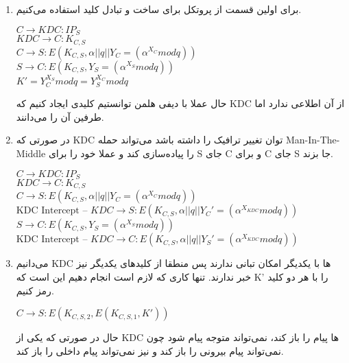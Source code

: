 \begin{enumerate}[label=\alph*)]
  \item 
برای اولین قسمت از پروتکل 
برای ساخت و تبادل کلید استفاده می‌کنیم.
\begin{latin}
  $C \rightarrow KDC: IP_S$\\
  $KDC \rightarrow C: K_{C,S}$\\
  $C \rightarrow S: E(K_{C,S},\alpha || q || Y_C = (\alpha^{X_C} mod q))$\\
  $S \rightarrow C: E(K_{C,S}, Y_S = (\alpha^{X_S} mod q))$\\
  $K' = Y_C ^ {X_S} modq = Y_S ^ {X_C} modq$
\end{latin}
حال عملا با دیفی هلمن توانستیم 
کلیدی ایجاد کنیم که KDC 
از آن اطلاعی ندارد اما طرفین آن را می‌دانند.
\item 
در صورتی که KDC 
توان تغییر ترافیک را داشته باشد می‌تواند حمله Man-In-The-Middle
را پیاده‌سازی کند و عملا خود را برای S جای C و برای C جای S جا بزند.
\begin{latin}
  $C \rightarrow KDC: IP_S$\\
  $KDC \rightarrow C: K_{C,S}$\\
  $C \rightarrow S: E(K_{C,S},\alpha || q || Y_C = (\alpha^{X_C} mod q))$\\
  $\text{KDC Intercept -- }KDC \rightarrow S: E(K_{C,S},\alpha || q || Y_C' = (\alpha^{X_{KDC}} mod q))$\\
  $S \rightarrow C: E(K_{C,S}, Y_S = (\alpha^{X_S} mod q))$\\
  $\text{KDC Intercept -- }KDC \rightarrow C: E(K_{C,S},\alpha || q || Y_S' = (\alpha^{X_{KDC}} mod q))$\\
\end{latin}


\item 
می‌دانیم 
KDC
ها
با یکدیگر امکان تبانی ندارند پس منطقا از کلید‌های یکدیگر نیز خبر ندارند.
تنها کاری که لازم است انجام دهیم این است که K'
را با هر دو کلید رمز کنیم.
\begin{latin}
  $C \rightarrow S: E(K_{C,S,2},E(K_{C,S,1},K'))$\\
\end{latin}
حال در صورتی که یکی از KDC
ها 
پیام را باز کند، نمی‌تواند متوجه پیام شود چون 
نمی‌تواند پیام بیرونی را باز کند و 
نیز نمی‌تواند پیام داخلی را باز کند.
\end{enumerate}